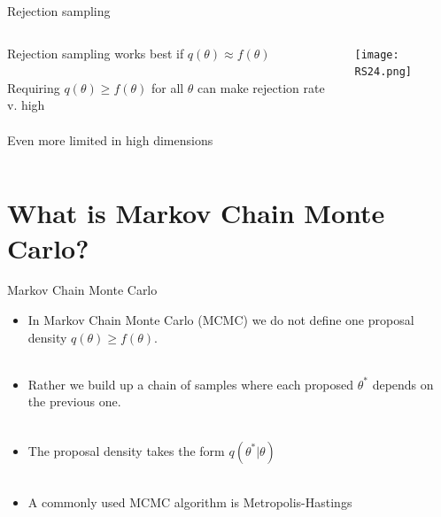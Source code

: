 \documentclass[compress]{beamer}
\begin{document}
\begin{frame}[label=sec-5-10]{Rejection sampling}
\begin{columns}[c] 
Rejection sampling works best if $q(\theta) \approx f(\theta)$ \\
\\
Requiring $q(\theta) \geqslant f(\theta)$ for all $\theta$ can make rejection rate v. high\\
\\
Even more limited in high dimensions

\texttt{[image: RS24.png]}
\end{columns}
\end{frame}

\section{What is Markov Chain Monte Carlo?}
\label{sec-7}
\begin{frame}[label=sec-7-1]{Markov Chain Monte Carlo}
\begin{itemize}
\item In Markov Chain Monte Carlo (MCMC) we do not define one proposal density $q(\theta) \geqslant f(\theta)$.\\
\\
\item Rather we build up a \alert{chain} of samples where each proposed $\theta^*$ depends on the previous one.\\
\\
\item The proposal density takes the form $q(\theta^* | \theta)$\\
\\
\item A commonly used MCMC algorithm is \alert{Metropolis-Hastings}
\end{itemize}
\end{frame}
\end{document}
